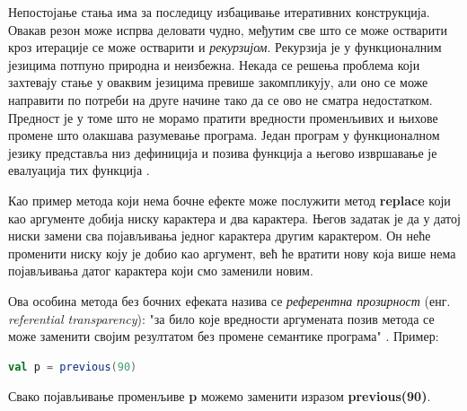 \documentclass[12pt,oneside]{memoir}
\begin{document}
\par Непостојање стања има за последицу избацивање итеративних конструкција. Овакав резон може испрва деловати чудно, међутим све што се може остварити кроз итерације се може остварити и \textit{рекурзијом}. Рекурзија је у функционалним језицима потпуно природна и неизбежна. Некада се решења проблема који захтевају стање у оваквим језицима превише закомпликују, али оно се може направити по потреби на друге начине тако да се ово не сматра недостатком. Предност је у томе што не морамо пратити вредности променљивих и њихове промене што олакшава разумевање програма. Један програм у функционалном језику представља низ дефиниција и позива функција а његово извршавање је евалуација тих функција \cite{funkMilena}.
\par Као пример метода који нема бочне ефекте може послужити метод \textbf{replace} који као аргументе добија ниску карактера и два карактера. Његов задатак је да у датој ниски замени сва појављивања једног карактера другим карактером. Он неће променити ниску коју је добио као аргумент, већ ће вратити нову која више нема појављивања датог карактера који смо заменили новим.  
\par Ова особина метода без бочних ефеката назива се \textit{референтна прозирност} (енг. \textit{referential transparency}): "за било које вредности аргумената позив метода се може заменити својим резултатом без промене семантике програма" \cite{progInScala}. Пример:

\begin{lstlisting}[language=Scala]
val p = previous(90)
\end{lstlisting}
Свако појављивање променљиве \textbf{p} можемо заменити изразом \textbf{previous(90)}.
\end{document}
